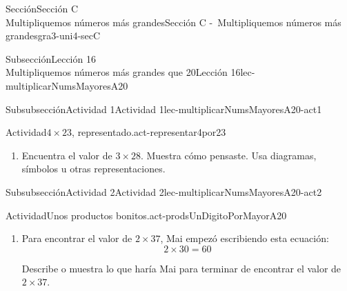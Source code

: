 \begin{sectionptx}{Sección}{{\Large Sección C\\}Multipliquemos números más grandes}{}{Sección C -~Multipliquemos números más grandes}{}{}{gra3-uni4-secC}
\begin{subsectionptx}{Subsección}{{\normalsize Lección 16\\[-0.05cm]}Multipliquemos números más grandes que 20}{}{Lección 16}{}{}{lec-multiplicarNumsMayoresA20}
\begin{subsubsectionptx}{Subsubsección}{Actividad 1}{}{Actividad 1}{}{}{lec-multiplicarNumsMayoresA20-act1}
\begin{activity}{Actividad}{\(4\times 23\), representado.}{act-representar4por23}
\begin{enumerate}
\begin{sidebyside}{2}{0}{0.3}{0.05}
\begin{sbspanel}{0.6}[center]
\end{sbspanel}%
\end{sidebyside}%
\begin{sidebyside}{2}{0}{0.3}{0.05}%
\begin{sbspanel}{0.05}[center]%
C%
\end{sbspanel}%
\begin{sbspanel}{0.6}[center]%
\texttt{[image: external/svg-source/tikz-file-152973-scale13.pdf]}
\end{sbspanel}%
\end{sidebyside}%
\begin{sidebyside}{2}{0}{0.3}{0.05}%
\begin{sbspanel}{0.05}[center]%
D%
\end{sbspanel}%
\begin{sbspanel}{0.6}[center]%
\texttt{[image: external/svg-source/tikz-file-152974-scale13.pdf]}
\end{sbspanel}%
\end{sidebyside}%
%
\begin{enumerate}
\item{}¿Qué observas sobre los números de sus diagramas?%
\item{}¿Cuál diagrama usarías para encontrar el valor de \(4\times 23\)? Explica tu razonamiento.%
\end{enumerate}
\item{}Encuentra el valor de \(3\times 28\). Muestra cómo pensaste. Usa diagramas, símbolos u otras representaciones.%
\end{enumerate}
\end{activity}%
\end{subsubsectionptx}
%
%
\typeout{************************************************}
\typeout{************************************************}
%
\clearpage
\begin{subsubsectionptx}{Subsubsección}{Actividad 2}{}{Actividad 2}{}{}{lec-multiplicarNumsMayoresA20-act2}
\begin{activity}{Actividad}{Unos productos bonitos.}{act-prodsUnDigitoPorMayorA20}%
%
\begin{enumerate}
\item{}Para encontrar el valor de \(2\times 37\), Mai empezó escribiendo esta ecuación:%
\begin{equation*}
2 \times 30 = 60
\end{equation*}
%
\par
Describe o muestra lo que haría Mai para terminar de encontrar el valor de \(2\times 37\).%

\end{enumerate}
\end{activity}
\end{subsubsectionptx}
\end{subsectionptx}
\end{sectionptx}
